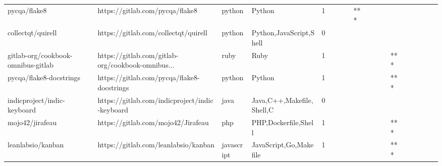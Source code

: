 \begin{tabular}{llllrlllllllllllll}
pycqa/flake8                                       &                    https://gitlab.com/pycqa/flake8 &            python &                                             Python &       1 &         &        &           &            *** &                 &        &           &           &          &          &       &              &          \\
collectqt/quirell                                  &               https://gitlab.com/collectqt/quirell &            python &                            Python,JavaScript,Shell &       0 &         &        &           &                &                 &        &           &           &          &          &       &              &          \\
gitlab-org/cookbook-omnibus-gitlab                 &  https://gitlab.com/gitlab-org/cookbook-omnibus... &              ruby &                                               Ruby &       1 &         &        &           &                &                 &        &           &       *** &          &          &       &              &          \\
pycqa/flake8-docstrings                            &         https://gitlab.com/pycqa/flake8-docstrings &            python &                                             Python &       1 &         &        &           &                &                 &        &           &       *** &          &          &       &              &          \\
indicproject/indic-keyboard                        &     https://gitlab.com/indicproject/indic-keyboard &              java &                          Java,C++,Makefile,Shell,C &       0 &         &        &           &                &                 &        &           &           &          &          &       &              &          \\
mojo42/jirafeau                                    &                 https://gitlab.com/mojo42/Jirafeau &               php &                               PHP,Dockerfile,Shell &       1 &         &        &           &                &                 &        &           &       *** &          &          &       &              &          \\
leanlabsio/kanban                                  &               https://gitlab.com/leanlabsio/kanban &        javascript &                             JavaScript,Go,Makefile &       1 &         &        &           &                &                 &        &           &       *** &          &          &       &              &          \\

\end{tabular}
